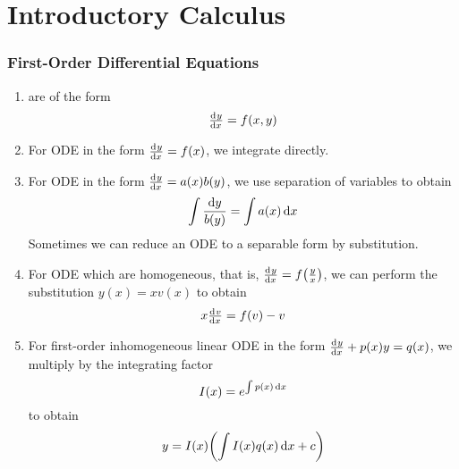 \documentclass{styles/note}
\author{Jiaming (George) Yu}
\date{\today}
\begin{document}
\maketitle
\tableofcontents
\newpage



\part{Introductory Calculus}

\section{First-Order Differential Equations}
  
  \begin{enumerate}[label=(\alph*)]
    \item {} are of the form
      \[ \od{y}{x} = f(x, y) \]
    
    \item For ODE in the form $\od{y}{x} = f(x)$, we integrate directly.
    
    \item For ODE in the form $\od{y}{x} = a(x) b(y)$, we use separation of variables to obtain
      \begin{equation}
        \int \frac{\dif y}{b(y)} = \int a(x) \dif x
      \end{equation}
      Sometimes we can reduce an ODE to a separable form by substitution.
    
    \item For ODE which are homogeneous, that is, $\od{y}{x} = f\left(\frac{y}{x}\right)$, we can perform the substitution $y(x) = x v(x)$ to obtain
      \begin{equation}
        x \od{v}{x} = f(v) - v
      \end{equation}
    
    \item For first-order inhomogeneous linear ODE in the form $\od{y}{x} + p(x)y = q(x)$, we multiply by the integrating factor
      \begin{equation}
        I(x) = e^{\int p(x) \dif x}
      \end{equation}
      to obtain
      \begin{equation}
        y = I(x) \left(\int I(x) q(x) \dif x + c\right)
      \end{equation}
  \end{enumerate}
\end{document}
